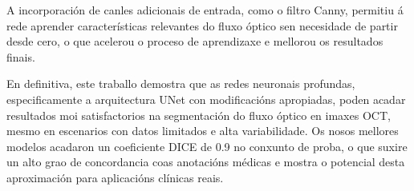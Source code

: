 \documentclass{article}
\begin{document}
A incorporación de canles adicionais de entrada, como o filtro Canny, permitiu á rede aprender características relevantes do fluxo óptico sen necesidade de partir desde cero, o que acelerou o proceso de aprendizaxe e mellorou os resultados finais.

En definitiva, este traballo demostra que as redes neuronais profundas, especificamente a arquitectura UNet con modificacións apropiadas, poden acadar resultados moi satisfactorios na segmentación do fluxo óptico en imaxes OCT, mesmo en escenarios con datos limitados e alta variabilidade. Os nosos mellores modelos acadaron un coeficiente DICE de 0.9 no conxunto de proba, o que suxire un alto grao de concordancia coas anotacións médicas e mostra o potencial desta aproximación para aplicacións clínicas reais.
\end{document}
